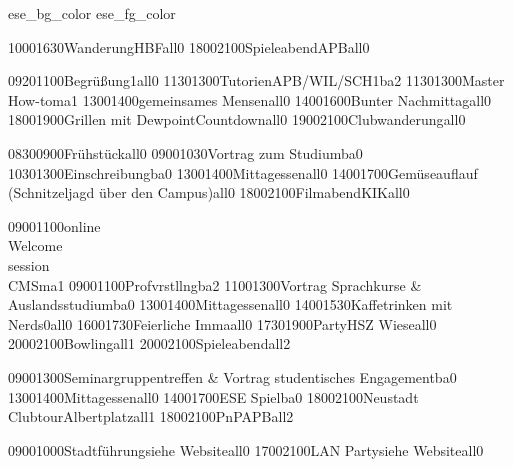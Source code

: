 \documentclass[a5paper,7pt]{scrreprt}
\begin{document}
\thispagestyle{empty}

\setslotsize{3.00cm}{0.25cm}
\settextframe{0.8mm}

\seteventcornerradius{0pt}



%
  {ese_bg_color}
  {ese_fg_color}
\begin{center}
\begin{timetable}
   {1000}{1630}{Wanderung}{}{HBF}{}{all}{0}
   {1800}{2100}{Spieleabend}{}{APB}{}{all}{0}

   {0920}{1100}{Begrüßung}{}{}{1}{all}{0}
   {1130}{1300}{Tutorien}{}{APB/WIL/SCH}{1}{ba}{2}
   {1130}{1300}{Master\\How-to}{}{}{}{ma}{1}
   {1300}{1400}{gemeinsames Mensen}{}{}{}{all}{0}
   {1400}{1600}{Bunter Nachmittag}{}{}{}{all}{0}
   {1800}{1900}{Grillen mit Dewpoint}{}{Countdown}{}{all}{0}
   {1900}{2100}{Clubwanderung}{}{}{}{all}{0}

   {0830}{0900}{Frühstück}{}{}{}{all}{0}
   {0900}{1030}{Vortrag zum Studium}{}{}{}{ba}{0}
   {1030}{1300}{Einschreibung}{}{}{}{ba}{0}
   {1300}{1400}{Mittagessen}{}{}{}{all}{0}
   {1400}{1700}{Gemüseauflauf (Schnitzeljagd über den Campus)}{}{}{}{all}{0}
   {1800}{2100}{Filmabend}{}{KIK}{}{all}{0}


   {0900}{1100}{online\\Welcome\\session\\CMS}{}{}{}{ma}{1}
   {0900}{1100}{Profvrstllng}{}{}{}{ba}{2}
   {1100}{1300}{Vortrag Sprachkurse & Auslandsstudium}{}{}{}{ba}{0}
   {1300}{1400}{Mittagessen}{}{}{}{all}{0}
   {1400}{1530}{Kaffetrinken mit Nerds}{}{}{0}{all}{0}
   {1600}{1730}{Feierliche Imma}{}{}{}{all}{0}
   {1730}{1900}{Party}{}{HSZ Wiese}{}{all}{0}
   {2000}{2100}{Bowling}{}{}{}{all}{1}
   {2000}{2100}{Spieleabend}{}{}{}{all}{2}

   {0900}{1300}{Seminargruppentreffen & Vortrag studentisches Engagement}{}{}{}{ba}{0}
   {1300}{1400}{Mittagessen}{}{}{}{all}{0}
   {1400}{1700}{ESE Spiel}{}{}{}{ba}{0}
   {1800}{2100}{Neustadt\\ Clubtour}{}{Albertplatz}{}{all}{1}
   {1800}{2100}{PnP}{}{APB}{}{all}{2}
  
   {0900}{1000}{Stadtführung}{}{siehe Website}{}{all}{0}
   {1700}{2100}{LAN Party}{}{siehe Website}{}{all}{0}
\end{timetable}
\end{center}
\end{document}
